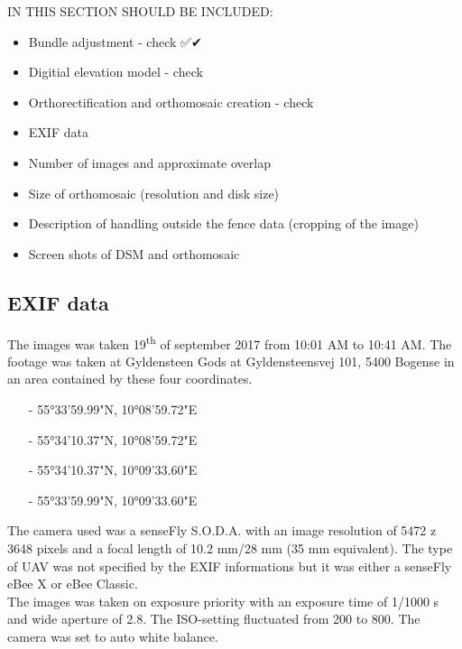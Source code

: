 \documentclass[../Head/Main.tex]{subfiles}
\begin{document}
IN THIS SECTION SHOULD BE INCLUDED:
\begin{itemize}
\item Bundle adjustment - check ✅✔
\item Digitial elevation model - check
\item Orthorectification and orthomosaic creation - check
\item EXIF data
\item Number of images and approximate overlap
\item Size of orthomosaic (resolution and disk size)
\item Description of handling outside the fence data (cropping of the image)
\item Screen shots of DSM and orthomosaic
\end{itemize}

\subsection{EXIF data}
The images was taken 19\textsuperscript{th} of september 2017 from 10:01 AM to 10:41 AM. The footage was taken at Gyldensteen Gods at Gyldensteensvej 101, 5400 Bogense in an area contained by these four coordinates.
\begin{itemize}
\item[-] 55°33'59.99"N, 10°08'59.72"E \vspace{-7pt}
\item[-] 55°34'10.37"N, 10°08'59.72"E \vspace{-7pt}
\item[-] 55°34'10.37"N, 10°09'33.60"E \vspace{-7pt}
\item[-] 55°33'59.99"N, 10°09'33.60"E
\end{itemize}

The camera used was a senseFly S.O.D.A. with an image resolution of 5472 z 3648 pixels and a focal length of 10.2 mm/28 mm (35 mm equivalent). The type of UAV was not specified by the EXIF informations but it was either a senseFly eBee X or eBee Classic.\\

The images was taken on exposure priority with an exposure time of 1/1000 s and wide aperture of 2.8. The ISO-setting fluctuated from 200 to 800. The camera was set to auto white balance.

\end{document}

